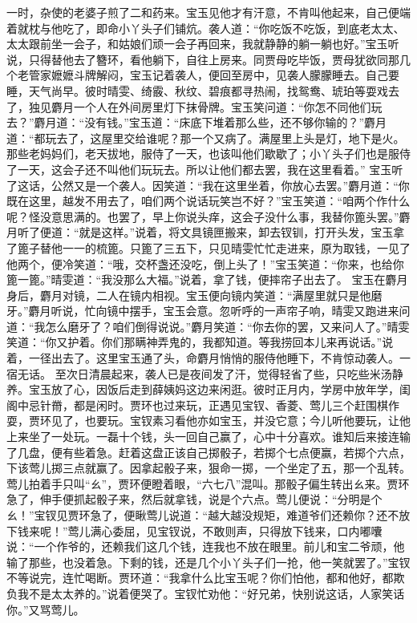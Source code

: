 \documentclass[12pt,oneside]{book}
\begin{document}
一时，杂使的老婆子煎了二和药来。宝玉见他才有汗意，不肯叫他起来，自己便端着就枕与他吃了，即命小丫头子们铺炕。袭人道：“你吃饭不吃饭，到底老太太、太太跟前坐一会子，和姑娘们顽一会子再回来，我就静静的躺一躺也好。”宝玉听说，只得替他去了簪环，看他躺下，自往上房来。同贾母吃毕饭，贾母犹欲同那几个老管家嬷嬷斗牌解闷，宝玉记着袭人，便回至房中，见袭人朦朦睡去。自己要睡，天气尚早。彼时晴雯、绮霰、秋纹、碧痕都寻热闹，找鸳鸯、琥珀等耍戏去了，独见麝月一个人在外间房里灯下抹骨牌。宝玉笑问道：“你怎不同他们玩去？”麝月道：“没有钱。”宝玉道：“床底下堆着那么些，还不够你输的？”麝月道：“都玩去了，这屋里交给谁呢？那一个又病了。满屋里上头是灯，地下是火。那些老妈妈们，老天拔地，服侍了一天，也该叫他们歇歇了；小丫头子们也是服侍了一天，这会子还不叫他们玩玩去。所以让他们都去罢，我在这里看着。”
宝玉听了这话，公然又是一个袭人。因笑道：“我在这里坐着，你放心去罢。”麝月道：“你既在这里，越发不用去了，咱们两个说话玩笑岂不好？”宝玉笑道：“咱两个作什么呢？怪没意思满的。也罢了，早上你说头痒，这会子没什么事，我替你篦头罢。”麝月听了便道：“就是这样。”说着，将文具镜匣搬来，卸去钗钏，打开头发，宝玉拿了篦子替他一一的梳篦。只篦了三五下，只见晴雯忙忙走进来，原为取钱，一见了他两个，便冷笑道：“哦，交杯盏还没吃，倒上头了！”宝玉笑道：“你来，也给你篦一篦。”晴雯道：“我没那么大福。”说着，拿了钱，便摔帘子出去了。
宝玉在麝月身后，麝月对镜，二人在镜内相视。宝玉便向镜内笑道：“满屋里就只是他磨牙。”麝月听说，忙向镜中摆手，宝玉会意。忽听呼的一声帘子响，晴雯又跑进来问道：“我怎么磨牙了？咱们倒得说说。”麝月笑道：“你去你的罢，又来问人了。”晴雯笑道：“你又护着。你们那瞒神弄鬼的，我都知道。等我捞回本儿来再说话。”说着，一径出去了。这里宝玉通了头，命麝月悄悄的服侍他睡下，不肯惊动袭人。一宿无话。
至次日清晨起来，袭人已是夜间发了汗，觉得轻省了些，只吃些米汤静养。宝玉放了心，因饭后走到薛姨妈这边来闲逛。彼时正月内，学房中放年学，闺阁中忌针黹，都是闲时。贾环也过来玩，正遇见宝钗、香菱、莺儿三个赶围棋作耍，贾环见了，也要玩。宝钗素习看他亦如宝玉，并没它意；今儿听他要玩，让他上来坐了一处玩。一磊十个钱，头一回自己赢了，心中十分喜欢。谁知后来接连输了几盘，便有些着急。赶着这盘正该自己掷骰子，若掷个七点便赢，若掷个六点，下该莺儿掷三点就赢了。因拿起骰子来，狠命一掷，一个坐定了五，那一个乱转。莺儿拍着手只叫“ㄠ”，贾环便瞪着眼，“六七八”混叫。那骰子偏生转出ㄠ来。贾环急了，伸手便抓起骰子来，然后就拿钱，说是个六点。莺儿便说：“分明是个ㄠ！”宝钗见贾环急了，便瞅莺儿说道：“越大越没规矩，难道爷们还赖你？还不放下钱来呢！”莺儿满心委屈，见宝钗说，不敢则声，只得放下钱来，口内嘟囔说：“一个作爷的，还赖我们这几个钱，连我也不放在眼里。前儿和宝二爷顽，他输了那些，也没着急。下剩的钱，还是几个小丫头子们一抢，他一笑就罢了。”宝钗不等说完，连忙喝断。贾环道：“我拿什么比宝玉呢？你们怕他，都和他好，都欺负我不是太太养的。”说着便哭了。宝钗忙劝他：“好兄弟，快别说这话，人家笑话你。”又骂莺儿。
\end{document}
